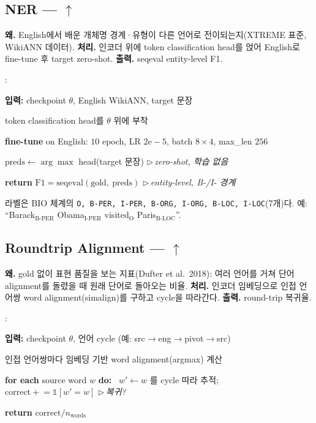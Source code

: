\documentclass[11pt,a4paper]{article}
\newcounter{pcln}
\newenvironment{pcode}{%
  \begin{list}{\scriptsize\arabic{pcln}:}{%
    \usecounter{pcln}\small
    \setlength{\leftmargin}{2.2em}\setlength{\labelwidth}{1.6em}%
    \setlength{\itemsep}{1.5pt}\setlength{\parsep}{0pt}\setlength{\topsep}{3pt}}%
}{\end{list}}
\newcommand{\kw}[1]{\textbf{#1}}                       %
\newcommand{\cmt}[1]{\hfill{\footnotesize$\triangleright$\,\textit{#1}}}  %
\newcommand{\up}{$\uparrow$}
\begin{document}
\subsection{NER --- \up}
\textbf{왜.} English에서 배운 개체명 경계·유형이 다른 언어로 전이되는지(XTREME 표준, WikiANN 데이터). \textbf{처리.} 인코더 위에 token classification head를 얹어 English로 fine-tune 후 target zero-shot. \textbf{출력.} seqeval entity-level F1.
\begin{algorithm}[h]
\caption{NER (English fine-tune, target zero-shot)}
\begin{pcode}
\item \kw{입력:} checkpoint $\theta$, English WikiANN, target 문장
\item token classification head를 $\theta$ 위에 부착
\item \kw{fine-tune} on English: $10$ epoch, LR $2\mathrm{e}{-}5$, batch $8{\times}4$, max\_len $256$
\item $\text{preds} \gets \arg\max$ head(target 문장) \cmt{zero-shot, 학습 없음}
\item \kw{return} $\mathrm{F1} = \mathrm{seqeval}(\text{gold},\ \text{preds})$ \cmt{entity-level, B-/I- 경계}
\end{pcode}
\end{algorithm}
라벨은 BIO 체계의 \texttt{O, B-PER, I-PER, B-ORG, I-ORG, B-LOC, I-LOC}(7개)다. 예: ``Barack$_{\text{B-PER}}$ Obama$_{\text{I-PER}}$ visited$_{\text{O}}$ Paris$_{\text{B-LOC}}$''.

\subsection{Roundtrip Alignment --- \up}
\textbf{왜.} gold 없이 표현 품질을 보는 지표(Dufter et al.\ 2018): 여러 언어를 거쳐 단어 alignment를 돌렸을 때 원래 단어로 돌아오는 비율. \textbf{처리.} 인코더 임베딩으로 인접 언어쌍 word alignment(simalign)를 구하고 cycle을 따라간다. \textbf{출력.} round-trip 복귀율.
\begin{algorithm}[h]
\caption{Roundtrip Alignment (simalign)}
\begin{pcode}
\item \kw{입력:} checkpoint $\theta$, 언어 cycle (예: src$\to$eng$\to$pivot$\to$src)
\item 인접 언어쌍마다 임베딩 기반 word alignment(argmax) 계산
\item \kw{for each} source word $w$ \kw{do:} \ $w' \gets w$ 를 cycle 따라 추적; \ $\text{correct}\mathrel{+}=\mathbb{1}[w'{=}w]$ \cmt{복귀?}
\item \kw{return} $\text{correct} / n_{\text{words}}$
\end{pcode}
\end{algorithm}
\end{document}
